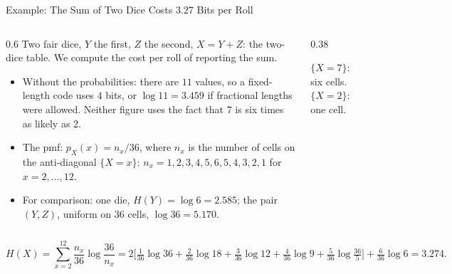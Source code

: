 \begin{frame}{Example: The Sum of Two Dice Costs $3.27$ Bits per Roll}
  \small
  \begin{columns}[T]
    \begin{column}{0.6\textwidth}
      Two fair dice, $Y$ the first, $Z$ the second, $X=Y+Z$: the two-dice table. We compute the cost per roll of reporting the sum.
      \begin{itemize}
        \item Without the probabilities: there are $11$ values, so a fixed-length code uses $4$ bits, or $\log11=3.459$ if fractional lengths were allowed. Neither figure uses the fact that $7$ is six times as likely as $2$.
        \item The pmf: $p_X(x)=n_x/36$, where $n_x$ is the number of cells on the anti-diagonal $\{X=x\}$: $n_x=1,2,3,4,5,6,5,4,3,2,1$ for $x=2,\dots,12$.
        \item For comparison: one die, $H(Y)=\log6=2.585$; the pair $(Y,Z)$, uniform on $36$ cells, $\log36=5.170$.
      \end{itemize}
    \end{column}
    \begin{column}{0.38\textwidth}
      \centering
      \par\smallskip
      {\footnotesize $\{X=7\}$: six cells. $\{X=2\}$: one cell.}
    \end{column}
  \end{columns}
  \[
    H(X)=\sum_{x=2}^{12}\frac{n_x}{36}\log\frac{36}{n_x}
    =2\Big[\tfrac1{36}\log36+\tfrac2{36}\log18+\tfrac3{36}\log12+\tfrac4{36}\log9+\tfrac5{36}\log\tfrac{36}5\Big]+\tfrac6{36}\log6
    =3.274 .
  \]
\end{frame}

